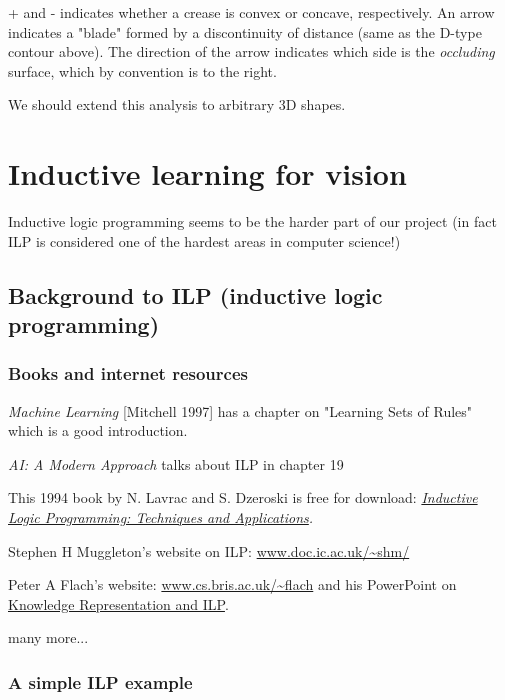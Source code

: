 + and - indicates whether a crease is convex or concave, respectively. An arrow indicates a "blade" formed by a discontinuity of distance (same as the D-type contour above). The direction of the arrow indicates which side is the \emph{occluding} surface, which by convention is to the right.

We should extend this analysis to arbitrary 3D shapes.

\section{Inductive learning for vision}

Inductive logic programming seems to be the harder part of our project (in fact ILP is considered one of the hardest areas in computer science!)

\subsection{Background to ILP (inductive logic programming)}

\subsubsection{Books and internet resources}
\begin{compactenum}
	\item \emph{Machine Learning} [Mitchell 1997] \emph{}has a chapter on "Learning Sets of Rules" which is a good introduction.
	\item \emph{AI: A Modern Approach} talks about ILP in chapter 19
	\item {\normalsize This 1994 book by N. Lavrac and S. Dzeroski is free for download: \textit{\href{http://www-ai.ijs.si/SasoDzeroski/ILPBook/}{Inductive Logic Programming: Techniques and Applications}.}}
	\item Stephen H Muggleton's website on ILP: \href{http://www.doc.ic.ac.uk/~shm/}{www.doc.ic.ac.uk/\textasciitilde shm/}
	\item Peter A Flach's website: \href{http://www.cs.bris.ac.uk/~flach/}{www.cs.bris.ac.uk/\textasciitilde flach} and his PowerPoint on \href{http://macflach.cs.bris.ac.uk/~flach/presentations/CL2000HTML/CL2000.ppt}{Knowledge Representation and ILP}.
	\item many more...
\end{compactenum}

\subsubsection{A simple ILP example}

